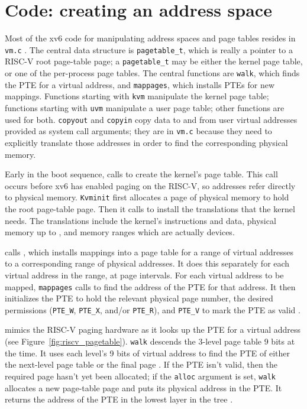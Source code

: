 \section{Code: creating an address space}

Most of the xv6 code for manipulating address spaces and
page tables resides in {\tt vm.c}
.
The central data structure is {\tt pagetable\_t}, which
is really a pointer to a RISC-V root page-table page;
a {\tt pagetable\_t} may be either the kernel
page table, or one of the per-process page tables.
The central functions are {\tt walk},
which finds the PTE for a virtual address,
and {\tt mappages}, which installs PTEs for new mappings.
Functions starting with {\tt kvm} manipulate
the kernel page table; functions starting with {\tt uvm}
manipulate a user page table; other functions are
used for both.
{\tt copyout} and {\tt copyin} copy data to and from
user virtual addresses provided as system call arguments;
they are in {\tt vm.c} because they need to explicitly
translate those addresses in order to find the corresponding
physical memory.

Early in the boot sequence,
calls
to create the kernel's page table.
This call occurs before xv6 has enabled paging on the RISC-V,
so addresses refer directly to physical memory.
\lstinline{Kvminit}
first allocates a page of physical memory to hold the root page-table page.
Then it calls
to install the translations that the kernel needs.
The translations include the kernel's
instructions and data, physical memory up to
,
and memory ranges which are actually devices.

calls
,
which
installs mappings into a page table
for a range of virtual addresses to
a corresponding range of physical addresses.
It does this separately for each virtual address in the range,
at page intervals.
For each virtual address to be mapped,
\lstinline{mappages}
calls
to find the address of the PTE for that address.
It then initializes the PTE to hold the relevant physical page
number, the desired permissions 
(\lstinline{PTE_W},
\lstinline{PTE_X},
and/or
\lstinline{PTE_R}),
and
\lstinline{PTE_V}
to mark the PTE as valid
.

mimics the RISC-V paging hardware as it
looks up the PTE for a virtual address (see
Figure~\ref{fig:riscv_pagetable}).
\lstinline{walk}
descends the 3-level page table 9 bits at the time.
It uses each level's 9 bits of virtual address to find
the PTE of either the next-level page table or the final page
.
If the PTE isn't valid, then
the required page hasn't yet been allocated;
if the
\lstinline{alloc}
argument is set,
\lstinline{walk}
allocates a new page-table page and puts its physical address in the PTE.
It returns the address of the PTE in the lowest layer in the tree
.

